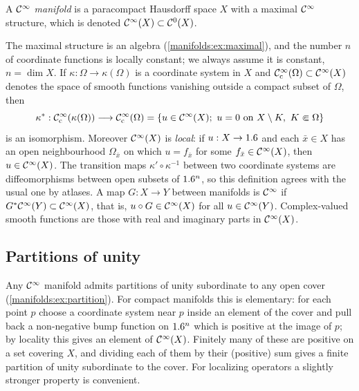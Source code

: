 \begin{definition}\label{manifolds:def:manifold}
A \emph{$\mathcal{C}^\infty$ manifold} is a paracompact Hausdorff space $X$ with a maximal
$\mathcal{C}^\infty$ structure, which is denoted $\mathcal{C}^\infty(X)\subset\mathcal{C}^0(X)$.
\end{definition}

The maximal structure is an algebra (\cref{manifolds:ex:maximal}), and the
number $n$ of coordinate functions is locally constant; we always assume it
is constant, $n=\dim X$. If $\kappa:\Omega\to\kappa(\Omega)$ is a coordinate
system in $X$ and $\mathcal{C}^\infty_{\mathrm{c}}(\Omega)\subset\mathcal{C}^\infty(X)$ denotes the space of smooth
functions vanishing outside a compact subset of $\Omega$, then
\begin{equation*}
\kappa^*:\mathcal{C}^\infty_{\mathrm{c}}(\kappa(\Omega))\longrightarrow\mathcal{C}^\infty_{\mathrm{c}}(\Omega)
=\{u\in\mathcal{C}^\infty(X);\ u=0 \text{ on } X\setminus K,\ K\Subset\Omega\}
\end{equation*}
is an isomorphism. Moreover $\mathcal{C}^\infty(X)$ is \emph{local}: if $u:X\to1.6$ and each
$\bar x\in X$ has an open neighbourhood $\Omega_{\bar x}$ on which
$u=f_{\bar x}$ for some $f_{\bar x}\in\mathcal{C}^\infty(X)$, then $u\in\mathcal{C}^\infty(X)$. The transition
maps $\kappa'\circ\kappa^{-1}$ between two coordinate systems are
diffeomorphisms between open subsets of $1.6^n$, so this definition agrees with
the usual one by atlases. A map $G:X\to Y$ between manifolds is $\mathcal{C}^\infty$ if
$G^*\mathcal{C}^\infty(Y)\subset\mathcal{C}^\infty(X)$, that is, $u\circ G\in\mathcal{C}^\infty(X)$ for all $u\in\mathcal{C}^\infty(Y)$.
Complex-valued smooth functions are those with real and imaginary parts in
$\mathcal{C}^\infty(X)$.

\subsection{Partitions of unity}
Any $\mathcal{C}^\infty$ manifold admits partitions of unity subordinate to any open cover
(\cref{manifolds:ex:partition}). For compact manifolds this is elementary: for
each point $p$ choose a coordinate system near $p$ inside an element of the
cover and pull back a non-negative bump function on $1.6^n$ which is positive at
the image of $p$; by locality this gives an element of $\mathcal{C}^\infty(X)$. Finitely many
of these are positive on a set covering $X$, and dividing each of them by
their (positive) sum gives a finite partition of unity subordinate to the cover.
For localizing operators a slightly stronger property is convenient.

